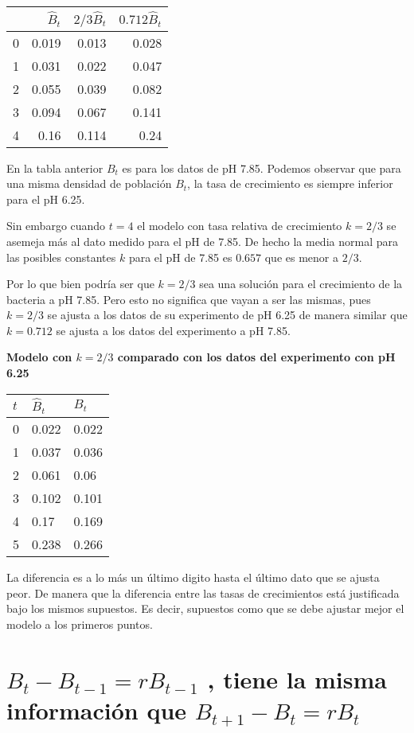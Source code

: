 \documentclass[11pt]{article}
\begin{document}
    \begin{longtable}[]{@{}rrrr@{}}
\toprule
& \(\hat B_t\) & \(2/3\hat B_t\) & \(0.712\hat B_t\) \\
\midrule
\endhead
0 & 0.019 & 0.013 & 0.028 \\
1 & 0.031 & 0.022 & 0.047 \\
2 & 0.055 & 0.039 & 0.082 \\
3 & 0.094 & 0.067 & 0.141 \\
4 & 0.16 & 0.114 & 0.24 \\
\bottomrule
\end{longtable}

    En la tabla anterior \(B_t\) es para los datos de pH 7.85. Podemos
observar que para una misma densidad de población \(B_t\), la tasa de
crecimiento es siempre inferior para el pH 6.25.

Sin embargo cuando \(t=4\) el modelo con tasa relativa de crecimiento
\(k=2/3\) se asemeja más al dato medido para el pH de 7.85. De hecho la
media normal para las posibles constantes \(k\) para el pH de 7.85 es
\(0.657\) que es menor a \(2/3\).

Por lo que bien podría ser que \(k=2/3\) sea una solución para el
crecimiento de la bacteria a pH 7.85. Pero esto no significa que vayan a
ser las mismas, pues \(k=2/3\) se ajusta a los datos de su experimento
de pH 6.25 de manera similar que \(k=0.712\) se ajusta a los datos del
experimento a pH 7.85.

\textbf{Modelo con \(k=2/3\) comparado con los datos del experimento con
pH 6.25}

\begin{longtable}[]{@{}lll@{}}
\toprule
\(t\) & \(\hat B_t\) & \(B_t\) \\
\midrule
\endhead
0 & 0.022 & 0.022 \\
1 & 0.037 & 0.036 \\
2 & 0.061 & 0.06 \\
3 & 0.102 & 0.101 \\
4 & 0.17 & 0.169 \\
5 & 0.238 & 0.266 \\
\bottomrule
\end{longtable}

La diferencia es a lo más un último digito hasta el último dato que se
ajusta peor. De manera que la diferencia entre las tasas de crecimientos
está justificada bajo los mismos supuestos. Es decir, supuestos como que
se debe ajustar mejor el modelo a los primeros puntos.

    \hypertarget{b_t-b_t1-r-b_t1-tiene-la-misma-informaciuxf3n-que-b_t1-b_t-r-b_t}{%
\section{\texorpdfstring{\(B_t − B_{t−1} = r B_{t−1}\) , tiene la
misma información que
\(B_{t+1} − B_t = r B_t\)}{2. B\_t − B\_\{t−1\} = r B\_\{t−1\} , tiene la misma información que B\_\{t+1\} − B\_t = r B\_t}}\label{b_t-b_t1-r-b_t1-tiene-la-misma-informaciuxf3n-que-b_t1-b_t-r-b_t}}
\end{document}
